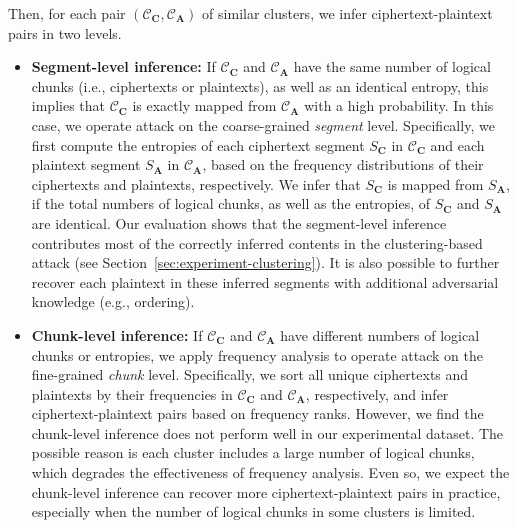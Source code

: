 Then, for each pair $(\mathcal{C}_\mathbf{C}, \mathcal{C}_\mathbf{A})$ of similar clusters, we infer ciphertext-plaintext pairs in two levels. 
\begin{itemize}[leftmargin=*]
    \item {\bf Segment-level inference:}
        If $\mathcal{C}_\mathbf{C}$ and $\mathcal{C}_\mathbf{A}$ have the same number of logical chunks (i.e., ciphertexts or plaintexts), as well as an identical entropy, this implies that $\mathcal{C}_\mathbf{C}$ is exactly mapped from $\mathcal{C}_\mathbf{A}$ with a high probability. In this case, we operate attack on the coarse-grained {\em segment} level. Specifically, we first compute the entropies of each ciphertext segment $S_\mathbf{C}$ in $\mathcal{C}_\mathbf{C}$ and each plaintext segment $S_\mathbf{A}$ in $\mathcal{C}_\mathbf{A}$, based on the frequency distributions of their ciphertexts and plaintexts, respectively. 
         We infer that $S_\mathbf{C}$ is mapped from  $S_\mathbf{A}$, if the total numbers of logical chunks, as well as the entropies, of $S_\mathbf{C}$ and $S_\mathbf{A}$ are identical. Our evaluation shows that the segment-level inference contributes most of the correctly inferred contents in the
        clustering-based attack (see
        Section~\ref{sec:experiment-clustering}). It is also possible to further recover each plaintext in these inferred segments with additional adversarial knowledge (e.g., ordering). 

        
    \item {\bf Chunk-level inference:}
        If $\mathcal{C}_\mathbf{C}$ and $\mathcal{C}_\mathbf{A}$ have different numbers of logical chunks or entropies, we apply frequency analysis to operate attack on the fine-grained {\em chunk} level. Specifically, we sort all unique ciphertexts and plaintexts by their frequencies in $\mathcal{C}_\mathbf{C}$ and $\mathcal{C}_\mathbf{A}$, respectively, and infer ciphertext-plaintext pairs based on frequency ranks.  
        However, we find the chunk-level inference does not perform well in our experimental dataset. The possible reason is each cluster includes a large number of logical chunks, which degrades the effectiveness of  frequency analysis. Even so, we expect the chunk-level inference can recover more ciphertext-plaintext pairs in practice, especially when the number of logical chunks in some clusters is limited.   
\end{itemize}

